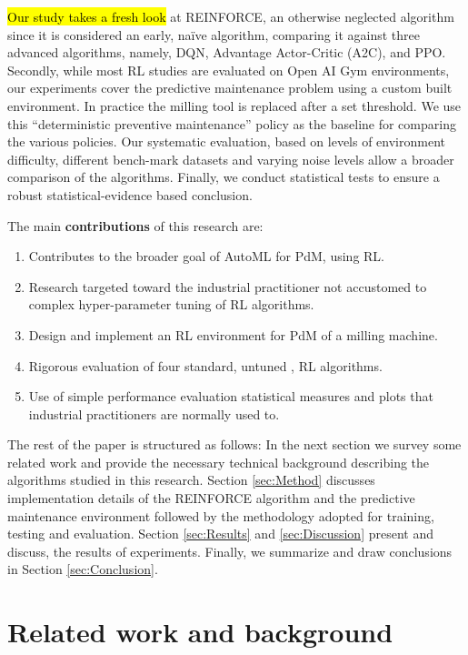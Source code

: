\documentclass[a4paper, 12pt]{article}
\newcommand{\hlc}[2][cyan!10]{{\colorlet{foo}{#1} \sethlcolor{foo}\hl{#2}}}
\begin{document}
\hlc{Our study takes a fresh look} at REINFORCE, an otherwise neglected algorithm since it is considered an early, na\"ive algorithm, comparing it against three advanced algorithms, namely, DQN, Advantage Actor-Critic (A2C), and PPO. Secondly, while most RL studies are evaluated on Open AI Gym environments, our experiments cover the predictive maintenance problem using a custom built environment. In practice the milling tool is replaced after a set threshold. We use this ``deterministic preventive maintenance'' policy as the baseline for comparing the various policies. Our systematic evaluation, based on levels of environment difficulty, different bench-mark datasets and varying noise levels allow a broader comparison of the algorithms. Finally, we conduct statistical tests to ensure a robust statistical-evidence based conclusion.

The main \textbf{contributions} of this research are:
\begin{enumerate}
	\item Contributes to the broader goal of AutoML for PdM, using RL.
	\item Research targeted toward the industrial practitioner not accustomed to complex hyper-parameter tuning of RL algorithms.
	\item Design and implement an RL environment for PdM of a milling machine.
	\item Rigorous evaluation of four standard, untuned , RL algorithms.
	\item Use of simple performance evaluation statistical measures and plots that industrial practitioners are normally used to.
\end{enumerate} 

The rest of the paper is structured as follows: In the next section we survey some related work and provide the necessary technical background describing the algorithms studied in this research. Section \ref{sec:Method} discusses implementation details of the REINFORCE algorithm and the predictive maintenance environment followed by the methodology adopted for training, testing and evaluation. Section \ref{sec:Results} and \ref{sec:Discussion} present and discuss, the results of experiments. Finally, we summarize and draw conclusions in Section \ref{sec:Conclusion}.

\section{Related work and background}\label{sec:SLR}
\end{document}
